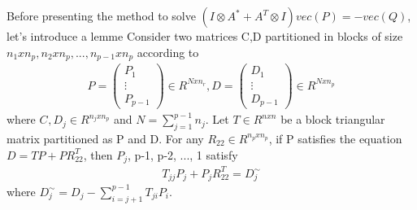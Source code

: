 \documentclass[11pt]{article}
\begin{document}
Before presenting the method to solve $(I \otimes A^{*} + A^{T} \otimes I) vec(P) = - vec(Q)$, let's introduce a lemme \label{lemme}
Consider two matrices C,D partitioned in blocks of size $n_{1} x n_{p}, n_{2} x n_{p}, ..., n_{p-1} x n_{p}$ according to
\begin{align*}
P = \begin{pmatrix} P_{1} \\ \vdots \\ P_{p-1} \end{pmatrix} \in R^{N x n_{r}}, D = \begin{pmatrix} D_{1} \\ \vdots \\ D_{p-1} \end{pmatrix} \in R^{N x n_{p}}
\end{align*}
where $C_{}, D_{j} \in R^{n_{j}xn_{p}}$ and $N = \sum_{j=1}^{p-1} n_{j}$. Let $T \in R^{nxn}$ be a block triangular matrix partitioned as P and D. For any $R_22 \in R^{n_{p}xn_{p}}$, if P satisfies the equation $D = T P + P R_{22}^{T}$, then $P_{j}$, p-1, p-2, ..., 1 satisfy 
\begin{align}
    T_{jj} P_{j} + P_{j} R_{22}^{T} = D_{j}^{\sim}
\end{align} \label{lemme}
where $D_{j}^{\sim} = D_{j} - \sum_{i=j+1}^{p-1} T_{ji} P_{i}$.
\end{document}

